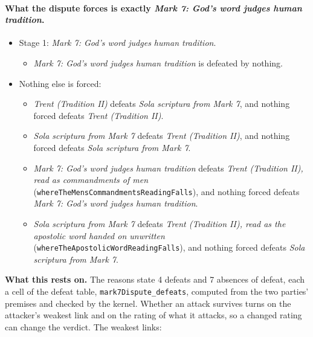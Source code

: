 \documentclass[11pt]{article}
\begin{document}
\paragraph{What the dispute forces is exactly \emph{Mark 7: God’s word judges human tradition}.}
\begin{itemize}
\item Stage 1: \emph{Mark 7: God’s word judges human tradition}.
\begin{itemize}
\item \emph{Mark 7: God’s word judges human tradition} is defeated by nothing.
\end{itemize}
\item Nothing else is forced:
\begin{itemize}
\item \emph{Trent (Tradition II)} defeats \emph{Sola scriptura from Mark 7}, and nothing forced defeats \emph{Trent (Tradition II)}.
\item \emph{Sola scriptura from Mark 7} defeats \emph{Trent (Tradition II)}, and nothing forced defeats \emph{Sola scriptura from Mark 7}.
\item \emph{Mark 7: God’s word judges human tradition} defeats \emph{Trent (Tradition II), read as commandments of men} (\texttt{where\allowbreak{}The\allowbreak{}Mens\allowbreak{}Commandments\allowbreak{}Reading\allowbreak{}Falls}), and nothing forced defeats \emph{Mark 7: God’s word judges human tradition}.
\item \emph{Sola scriptura from Mark 7} defeats \emph{Trent (Tradition II), read as the apostolic word handed on unwritten} (\texttt{where\allowbreak{}The\allowbreak{}Apostolic\allowbreak{}Word\allowbreak{}Reading\allowbreak{}Falls}), and nothing forced defeats \emph{Sola scriptura from Mark 7}.
\end{itemize}
\end{itemize}
\par\noindent\textbf{What this rests on.} The reasons state 4 defeats and 7 absences of defeat, each a cell of the defeat table, \texttt{mark7\allowbreak{}Dispute\_\allowbreak{}defeats}, computed from the two parties' premises and checked by the kernel. Whether an attack survives turns on the attacker's weakest link and on the rating of what it attacks, so a changed rating can change the verdict. The weakest links:
\end{document}
